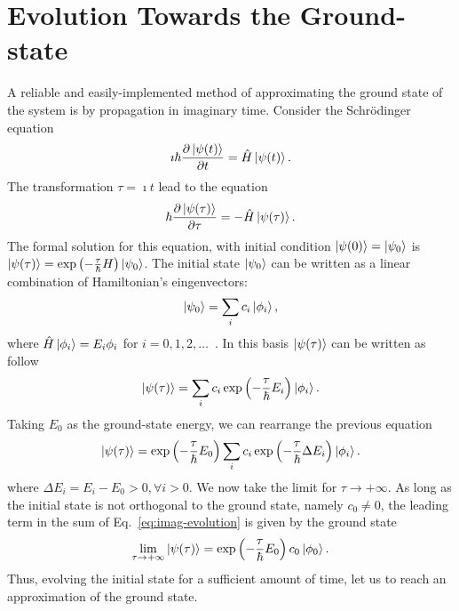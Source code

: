 \section{Evolution Towards the Ground-state}
A reliable and easily-implemented method of approximating the ground state of the
system is by propagation in imaginary time. Consider the Schr\"odinger equation
\begin{equation}
\imath \hbar \frac{\partial \ket{\psi(t)}}{\partial t} = \hat{H} \ket{\psi(t)}.
\end{equation}
The transformation $ \tau = \imath t$ lead to the equation
\begin{equation}
\hbar \frac{\partial \ket{\psi(\tau)}}{\partial \tau} = - \hat{H} \ket{\psi(\tau)}.
\end{equation}
The formal solution for this equation, with initial condition $\ket{\psi(0)} = \ket{\psi_0}$ is $\ket{\psi(\tau)} = \exp\left( -\frac{\tau}{\hbar} H \right) \ket{\psi_0}$. The initial state $\ket{\psi_0}$ can be written as a linear combination of Hamiltonian's eingenvectors:
\begin{equation}
\ket{\psi_0} = \sum_i c_i \ket{\phi_i},
\end{equation}
where $\hat{H} \ket{\phi_i} = E_i \phi_i$ for $i = 0,1,2,\ldots$~. In this basis $\ket{\psi(\tau)}$ can be written as follow
\begin{equation}
\ket{\psi(\tau)} = \sum_i c_i \exp\left( -\frac{\tau}{\hbar} E_i \right) \ket{\phi_i}.
\end{equation}
Taking $E_0$ as the ground-state energy, we can rearrange the previous equation
\begin{equation} \label{eq:imag-evolution}
\ket{\psi(\tau)} = \exp \left( -\frac{\tau}{\hbar} E_0 \right) \sum_i c_i  \exp\left( -\frac{\tau}{\hbar} \Delta E_i \right) \ket{\phi_i}.
\end{equation}
where $\Delta E_i = E_i - E_0 > 0,  \forall i > 0$. We now take the limit for $\tau \rightarrow +\infty$. As long as the initial state is not orthogonal to the ground state, namely $c_0 \neq 0$, the leading term in the sum of Eq.~\eqref{eq:imag-evolution} is given by the ground state
\begin{equation}
\lim_{\tau \rightarrow +\infty} \ket{\psi(\tau)} = \exp \left( -\frac{\tau}{\hbar} E_0 \right) c_0 \ket{\phi_0}.
\end{equation}
Thus, evolving the initial state for a sufficient amount of time, let us to reach an  approximation of the ground state.


